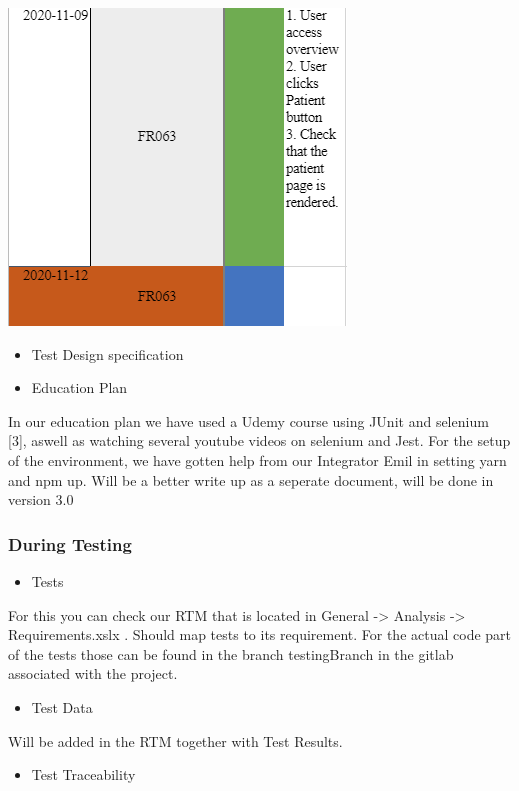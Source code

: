     \vfill
\includegraphics[]{Pictures/TestCase4.PNG}

    \vfill
\begin{itemize}

    \item{Test Design specification}
    \item{Education Plan}
    \end{itemize}
    In our education plan we have used a Udemy course using JUnit and selenium [3], aswell as watching several youtube videos on selenium and Jest. For the setup of the environment, we have gotten help from our Integrator Emil in setting yarn and npm up. Will be a better write up as a seperate document, will be done in version 3.0

\subsubsection{During Testing}
\begin{itemize}
    \item Tests
\end{itemize}
For this you can check our RTM that is located in General -> Analysis -> Requirements.xslx . Should map tests to its requirement. For the actual code part of the tests those can be found in the branch testingBranch in the gitlab associated with the project. 
\begin{itemize}
    
    \item{Test Data}
\end{itemize}
Will be added in the RTM together with Test Results.
\begin{itemize}

    \item{Test Traceability}

\end{itemize}
